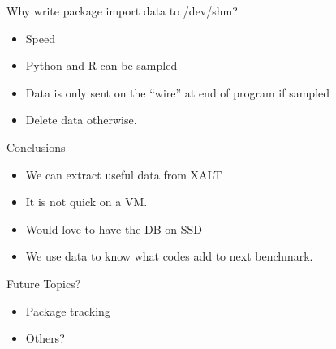 \documentclass{beamer}
\begin{document}
\begin{frame}{Why write package import data to /dev/shm?}
  \begin{itemize}
    \item Speed
    \item Python and R can be sampled
    \item Data is only sent on the ``wire'' at end of program if sampled
    \item Delete data otherwise.
  \end{itemize}
\end{frame}


\begin{frame}{Conclusions}
  \begin{itemize}
    \item We can extract useful data from XALT
    \item It is not quick on a VM.
    \item Would love to have the DB on SSD
    \item We use data to know what codes add to next benchmark.
  \end{itemize}
\end{frame}


\begin{frame}{Future Topics?} 
  \begin{itemize}
    \item Package tracking
    \item Others?
  \end{itemize}
\end{frame}
%

%
\end{document}
